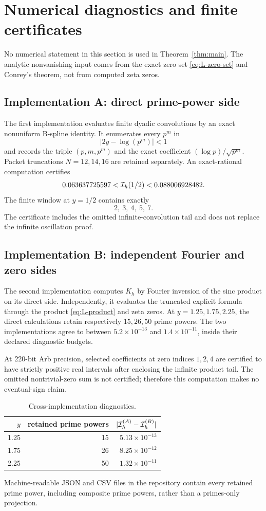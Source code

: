 \section{Numerical diagnostics and finite certificates}
\label{sec:numerics}

No numerical statement in this section is used in
Theorem~\ref{thm:main}.  The analytic nonvanishing input comes from the exact
zero set \eqref{eq:L-zero-set} and Conrey's theorem, not from computed zeta
zeros.

\subsection{Implementation A: direct prime-power side}

The first implementation evaluates finite dyadic convolutions by an exact
nonuniform B-spline identity.  It enumerates every \(p^m\) in
\[
|2y-\log(p^m)|<1
\]
and records the triple \((p,m,p^m)\) and the exact coefficient
\((\log p)/\sqrt{p^m}\).  Packet truncations \(N=12,14,16\) are retained
separately.  An exact-rational computation certifies
\[
0.063637725597
<
\mathcal I_h(1/2)
<
0.088006928482.
\]
The finite window at \(y=1/2\) contains exactly
\[
2,\ 3,\ 4,\ 5,\ 7.
\]
The certificate includes the omitted infinite-convolution tail and does not
replace the infinite oscillation proof.

\subsection{Implementation B: independent Fourier and zero sides}

The second implementation computes \(K_h\) by Fourier inversion of the sinc
product on its direct side.  Independently, it evaluates the truncated
explicit formula through the product \eqref{eq:L-product} and zeta zeros.
At \(y=1.25,1.75,2.25\), the direct calculations retain respectively
\(15,26,50\) prime powers.  The two implementations agree to between
\(5.2\times10^{-13}\) and \(1.4\times10^{-11}\), inside their declared
diagnostic budgets.

At 220-bit Arb precision, selected coefficients at zero indices \(1,2,4\)
are certified to have strictly positive real intervals after enclosing the
infinite product tail.  The omitted nontrivial-zero sum is not certified;
therefore this computation makes no eventual-sign claim.

\begin{table}[ht]
\centering
\begin{tabular}{@{}rrr@{}}
\toprule
\(y\) & retained prime powers & \(|\mathcal I_h^{(A)}-\mathcal I_h^{(B)}|\)\\
\midrule
1.25 & 15 & \(5.13\times10^{-13}\)\\
1.75 & 26 & \(8.25\times10^{-12}\)\\
2.25 & 50 & \(1.32\times10^{-11}\)\\
\bottomrule
\end{tabular}
\caption{Cross-implementation diagnostics.}
\end{table}

Machine-readable JSON and CSV files in the repository contain every retained
prime power, including composite prime powers, rather than a primes-only
projection.
